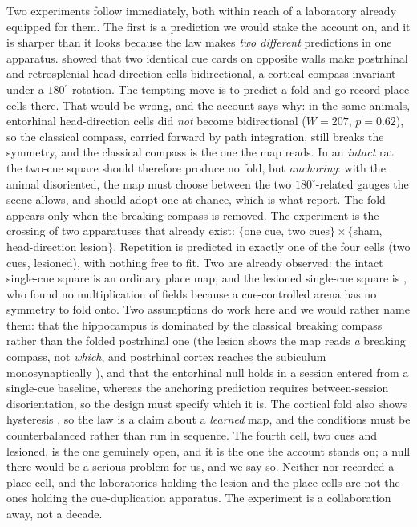 \documentclass[9pt,lineno]{elife}
\begin{document}
Two experiments follow immediately, both within reach of a laboratory already equipped for them. The
first is a prediction we would stake the account on, and it is sharper than it looks because the law
makes \emph{two different} predictions in one apparatus. \citet{lachance2024} showed that two identical
cue cards on opposite walls make postrhinal and retrosplenial head-direction cells bidirectional, a
cortical compass invariant under a $180^\circ$ rotation. The tempting move is to predict a fold and go
record place cells there. That would be wrong, and the account says why: in the same animals, entorhinal
head-direction cells did \emph{not} become bidirectional ($W = 207$, $p = 0.62$), so the classical
compass, carried forward by path integration, still breaks the symmetry, and the classical compass is
the one the map reads. In an \emph{intact} rat the two-cue square should therefore produce no fold, but
\emph{anchoring}: with the animal disoriented, the map must choose between the two $180^\circ$-related
gauges the scene allows, and should adopt one at chance, which is what \citet{keinath2017} report. The
fold appears only when the breaking compass is removed. The experiment is the crossing of two apparatuses
that already exist: $\{$one cue, two cues$\} \times \{$sham, head-direction lesion$\}$. Repetition is
predicted in exactly one of the four cells (two cues, lesioned), with nothing free to fit. Two are
already observed: the intact single-cue square is an ordinary place map, and the lesioned single-cue
square is \citet{calton2003}, who found no multiplication of fields because a cue-controlled arena has no
symmetry to fold onto. Two assumptions do work here and we would rather name them: that the hippocampus
is dominated by the classical breaking compass rather than the folded postrhinal one (the lesion shows
the map reads \emph{a} breaking compass, not \emph{which}, and postrhinal cortex reaches the subiculum
monosynaptically \citep{naber2001}), and that the entorhinal null holds in a session entered from a
single-cue baseline, whereas the anchoring prediction requires between-session disorientation, so the
design must specify which it is. The cortical fold also shows hysteresis \citep{lachance2024}, so the law
is a claim about a \emph{learned} map, and the conditions must be counterbalanced rather than run in
sequence. The fourth cell, two cues and lesioned, is the one genuinely open, and it is the one the
account stands on; a null there would be a serious problem for us, and we say so. Neither
\citet{lachance2024} nor \citet{zhang2022} recorded a place cell, and the laboratories holding the lesion
and the place cells \citep{harland2017} are not the ones holding the cue-duplication apparatus. The
experiment is a collaboration away, not a decade.
\end{document}
